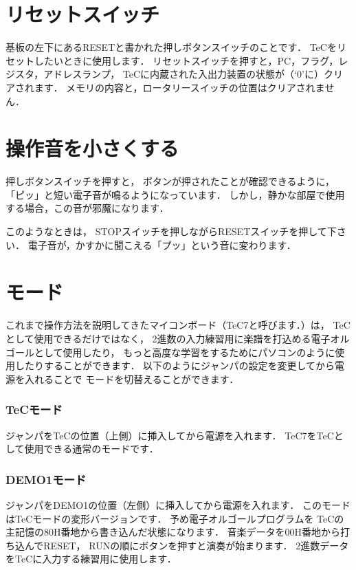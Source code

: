 \section{リセットスイッチ}
基板の左下にあるRESETと書かれた押しボタンスイッチのことです．
TeCをリセットしたいときに使用します．
リセットスイッチを押すと，PC，フラグ，レジスタ，アドレスランプ，
TeCに内蔵された入出力装置の状態が（`0'に）クリアされます．
メモリの内容と，ロータリースイッチの位置はクリアされません．

\section{操作音を小さくする}
押しボタンスイッチを押すと，
ボタンが押されたことが確認できるように，
「ピッ」と短い電子音が鳴るようになっています．
しかし，静かな部屋で使用する場合，この音が邪魔になります．

このようなときは，
STOPスイッチを押しながらRESETスイッチを押して下さい．
電子音が，かすかに聞こえる「プッ」という音に変わります．

\section{モード}
これまで操作方法を説明してきたマイコンボード（TeC7と呼びます．）は，
TeCとして使用できるだけではなく，
2進数の入力練習用に楽譜を打込める電子オルゴールとして使用したり，
もっと高度な学習をするためにパソコンのように使用したりすることができます．
以下のようにジャンパの設定を変更してから電源を入れることで
モードを切替えることができます．


\subsubsection{TeCモード}
ジャンパをTeCの位置（上側）に挿入してから電源を入れます．
TeC7をTeCとして使用できる通常のモードです．

\subsubsection{DEMO1モード}
ジャンパをDEMO1の位置（左側）に挿入してから電源を入れます．
このモードはTeCモードの変形バージョンです．
予め電子オルゴールプログラムを
TeCの主記憶の80H番地から書き込んだ状態になります．
音楽データを00H番地から打ち込んでRESET，
RUNの順にボタンを押すと演奏が始まります．
2進数データをTeCに入力する練習用に使用します．

